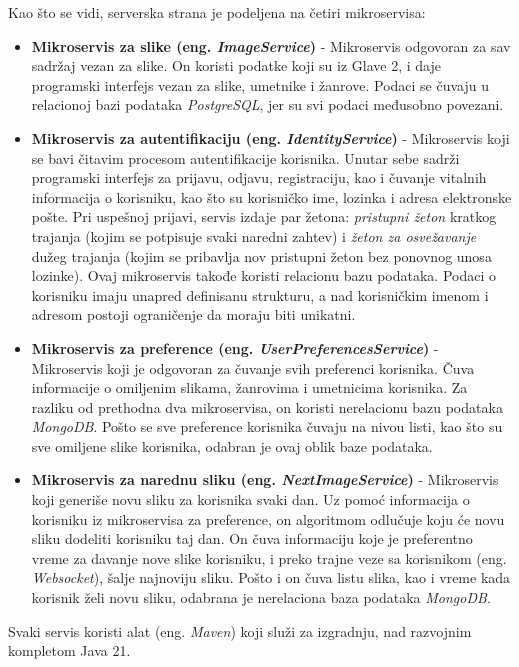 \documentclass[12pt,oneside]{memoir}
\begin{document}
Kao što se vidi, serverska strana je podeljena na četiri mikroservisa:
\begin{itemize}
\item \textbf{Mikroservis za slike (eng. \textit{ImageService})} - Mikroservis odgovoran za sav sadržaj vezan za slike. On koristi podatke koji su iz Glave 2, i daje programski interfejs vezan za slike, umetnike i žanrove. Podaci se čuvaju u relacionoj bazi podataka \emph{PostgreSQL}, jer su svi podaci međusobno povezani.
\item \textbf{Mikroservis za autentifikaciju (eng. \textit{IdentityService})} - Mikroservis koji se bavi čitavim procesom autentifikacije korisnika. Unutar sebe sadrži programski interfejs za prijavu, odjavu, registraciju, kao i čuvanje vitalnih informacija o korisniku, kao što su korisničko ime, lozinka i adresa elektronske pošte. Pri uspešnoj prijavi, servis izdaje par žetona: \emph{pristupni žeton} kratkog trajanja (kojim se potpisuje svaki naredni zahtev) i \emph{žeton za osvežavanje} dužeg trajanja (kojim se pribavlja nov pristupni žeton bez ponovnog unosa lozinke). Ovaj mikroservis takođe koristi relacionu bazu podataka. Podaci o korisniku imaju unapred definisanu strukturu, a nad korisničkim imenom i adresom postoji ograničenje da moraju biti unikatni.
\item \textbf{Mikroservis za preference (eng. \textit{UserPreferencesService})} - Mikroservis koji je odgovoran za čuvanje svih preferenci korisnika. Čuva informacije o omiljenim slikama, žanrovima i umetnicima korisnika. Za razliku od prethodna dva mikroservisa, on koristi nerelacionu bazu podataka \emph{MongoDB}. Pošto se sve preference korisnika čuvaju na nivou listi, kao što su sve omiljene slike korisnika, odabran je ovaj oblik baze podataka. 
\item \textbf{Mikroservis za narednu sliku (eng. \textit{NextImageService})} - Mikroservis koji generiše novu sliku za korisnika svaki dan. Uz pomoć informacija o korisniku iz mikroservisa za preference, on algoritmom odlučuje koju će novu sliku dodeliti korisniku taj dan. On čuva informaciju koje je preferentno vreme za davanje nove slike korisniku, i preko trajne veze sa korisnikom (eng. \textit{Websocket}), šalje najnoviju sliku. Pošto i on čuva listu slika, kao i vreme kada korisnik želi novu sliku, odabrana je nerelaciona baza podataka \emph{MongoDB}.
\end{itemize}


Svaki servis koristi alat (eng. \textit{Maven}) koji služi za izgradnju, nad razvojnim kompletom Java 21. 
\end{document}
